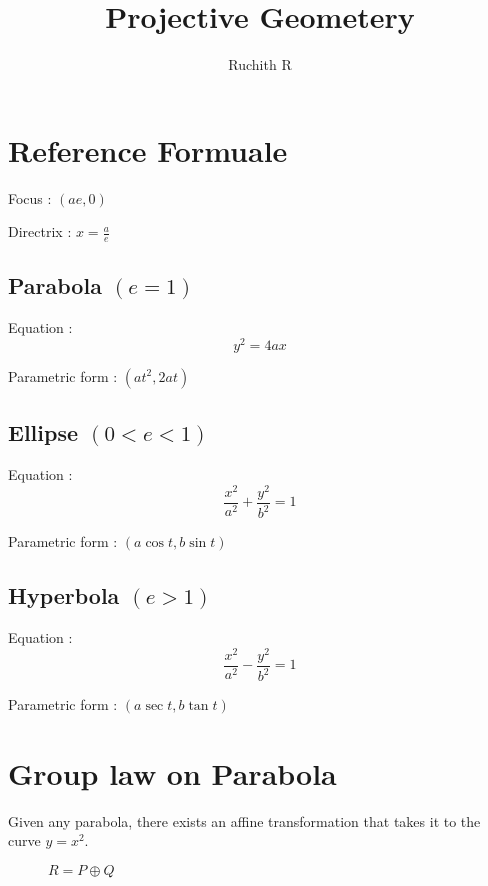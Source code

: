 \documentclass{report}
\begin{document}
\title{Projective Geometery}
\author{Ruchith R}
\date{}

\section*{Reference Formuale}
Focus : $(ae,0)$

\noindent Directrix : $x = \frac{a}{e}$
\subsection*{Parabola $(e = 1)$}

Equation : $$y^2 = 4ax$$

\noindent Parametric form : $(at^2,2at)$

\subsection*{Ellipse $(0 < e < 1)$}
Equation : $$\frac{x^2}{a^2} + \frac{y^2}{b^2} = 1$$

\noindent Parametric form : $(a\cos t,b\sin t)$

\subsection*{Hyperbola $(e > 1)$}
Equation : $$\frac{x^2}{a^2} - \frac{y^2}{b^2} = 1$$

\noindent Parametric form : $(a\sec t,b\tan t)$

\section*{Group law on Parabola}

Given any parabola, there exists an affine transformation that takes it to the curve $y = x^2$.
\begin{figure}[H]
    \centering
    \caption{$R = P\oplus Q$}
\end{figure}
\end{document}
